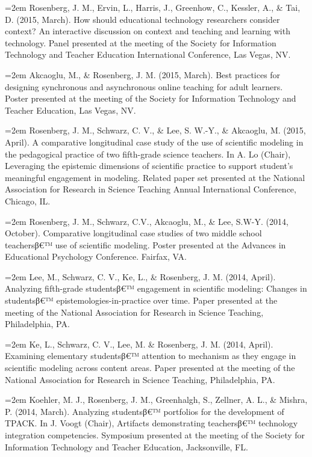 \documentclass[]{article}
\newcommand{\euro}{€}
\begin{document}
\hangindent=2em Rosenberg, J. M., Ervin, L., Harris, J., Greenhow, C.,
Kessler, A., \& Tai, D. (2015, March). How should educational technology
researchers consider context? An interactive discussion on context and
teaching and learning with technology. Panel presented at the meeting of
the Society for Information Technology and Teacher Education
International Conference, Las Vegas, NV.

\hangindent=2em Akcaoglu, M., \& Rosenberg, J. M. (2015, March). Best
practices for designing synchronous and asynchronous online teaching for
adult learners. Poster presented at the meeting of the Society for
Information Technology and Teacher Education, Las Vegas, NV.

\hangindent=2em Rosenberg, J. M., Schwarz, C. V., \& Lee, S. W.-Y., \&
Akcaoglu, M. (2015, April). A comparative longitudinal case study of the
use of scientific modeling in the pedagogical practice of two
fifth-grade science teachers. In A. Lo (Chair), Leveraging the epistemic
dimensions of scientific practice to support student's meaningful
engagement in modeling. Related paper set presented at the National
Association for Research in Science Teaching Annual International
Conference, Chicago, IL.

\hangindent=2em Rosenberg, J. M., Schwarz, C.V., Akcaoglu, M., \& Lee,
S.W-Y. (2014, October). Comparative longitudinal case studies of two
middle school teachersβ\euro{}™ use of scientific modeling. Poster
presented at the Advances in Educational Psychology Conference. Fairfax,
VA.

\hangindent=2em Lee, M., Schwarz, C. V., Ke, L., \& Rosenberg, J. M.
(2014, April). Analyzing fifth-grade studentsβ\euro{}™ engagement in
scientific modeling: Changes in studentsβ\euro{}™
epistemologies-in-practice over time. Paper presented at the meeting of
the National Association for Research in Science Teaching, Philadelphia,
PA.

\hangindent=2em Ke, L., Schwarz, C. V., Lee, M. \& Rosenberg, J. M.
(2014, April). Examining elementary studentsβ\euro{}™ attention to
mechanism as they engage in scientific modeling across content areas.
Paper presented at the meeting of the National Association for Research
in Science Teaching, Philadelphia, PA.

\hangindent=2em Koehler, M. J., Rosenberg, J. M., Greenhalgh, S.,
Zellner, A. L., \& Mishra, P. (2014, March). Analyzing studentsβ\euro{}™
portfolios for the development of TPACK. In J. Voogt (Chair), Artifacts
demonstrating teachersβ\euro{}™ technology integration competencies.
Symposium presented at the meeting of the Society for Information
Technology and Teacher Education, Jacksonville, FL.
\end{document}
